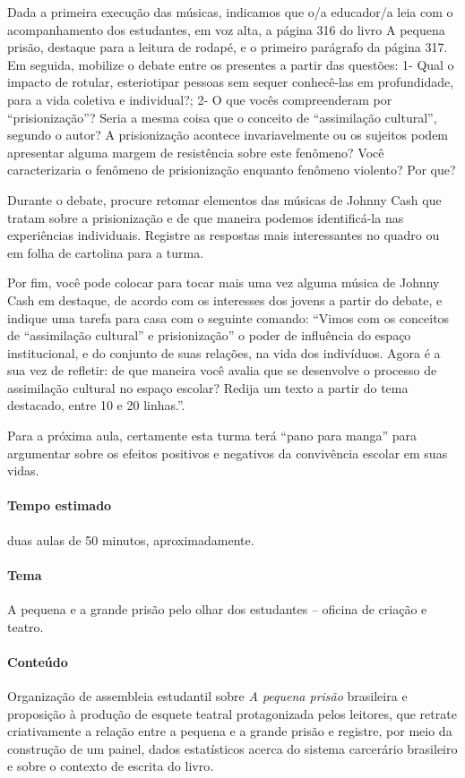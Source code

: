 \documentclass[11pt]{extarticle}
\begin{document}
Dada a primeira execução das músicas, indicamos que o/a educador/a leia
com o acompanhamento dos estudantes, em voz alta, a página 316 do livro
A pequena prisão, destaque para a leitura de rodapé, e o primeiro
parágrafo da página 317. Em seguida, mobilize o debate entre os
presentes a partir das questões: 1- Qual o impacto de rotular,
esteriotipar pessoas sem sequer conhecê-las em profundidade, para a vida
coletiva e individual?; 2- O que vocês compreenderam por
``prisionização''? Seria a mesma coisa que o conceito de ``assimilação
cultural'', segundo o autor? A prisionização acontece invariavelmente ou
os sujeitos podem apresentar alguma margem de resistência sobre este
fenômeno? Você caracterizaria o fenômeno de prisionização enquanto
fenômeno violento? Por que?

Durante o debate, procure retomar elementos das músicas de Johnny Cash
que tratam sobre a prisionização e de que maneira podemos identificá-la
nas experiências individuais. Registre as respostas mais interessantes
no quadro ou em folha de cartolina para a turma.

Por fim, você pode colocar para tocar mais uma vez alguma música de
Johnny Cash em destaque, de acordo com os interesses dos jovens a partir
do debate, e indique uma tarefa para casa com o seguinte comando:
``Vimos com os conceitos de ``assimilação cultural'' e prisionização'' o
poder de influência do espaço institucional, e do conjunto de suas
relações, na vida dos indivíduos. Agora é a sua vez de refletir: {de que
maneira você avalia que se desenvolve o processo de assimilação cultural
no espaço escolar?} Redija um texto a partir do tema destacado, entre 10
e 20 linhas.''.

Para a próxima aula, certamente esta turma terá ``pano para manga'' para
argumentar sobre os efeitos positivos e negativos da convivência escolar
em suas vidas.

\paragraph{Tempo estimado} duas aulas de 50 minutos, aproximadamente.

\paragraph{Tema} A pequena e a grande prisão pelo olhar dos estudantes
-- oficina de criação e teatro.

\paragraph{Conteúdo} Organização de assembleia estudantil sobre \emph{A
pequena prisão} brasileira e proposição à produção de esquete teatral
protagonizada pelos leitores, que retrate criativamente a relação entre
a pequena e a grande prisão e registre, por meio da construção de um
painel, dados estatísticos acerca do sistema carcerário brasileiro e
sobre o contexto de escrita do livro.
\end{document}

